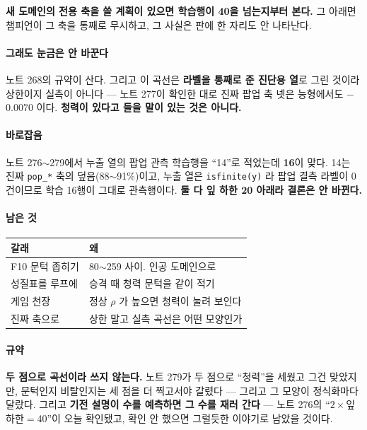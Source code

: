 \documentclass[10pt]{article}
\begin{document}
\textbf{새 도메인의 전용 축을 쓸 계획이 있으면 학습행이 40을 넘는지부터
본다.} 그 아래면 챔피언이 그 축을 통째로 무시하고, 그 사실은 판에 한 자리도
안 나타난다.

\paragraph{그래도 눈금은 안 바꾼다} 노트 268의 규약이 산다. 그리고 이
곡선은 \textbf{라벨을 통째로 준 진단용 열}로 그린 것이라 상한이지 실측이
아니다 --- 노트 277이 확인한 대로 진짜 팝업 축 넷은 능형에서도 $-$0.0070
이다. \textbf{청력이 있다고 들을 말이 있는 것은 아니다.}

\paragraph{바로잡음} 노트 276$\sim$279에서 누출 열의 팝업 관측 학습행을
``14''로 적었는데 \textbf{16}이 맞다. 14는 진짜 \texttt{pop\_*} 축의
덮음(88$\sim$91\%)이고, 누출 열은 \texttt{isfinite(y)} 라 팝업 결측 라벨이
0건이므로 학습 16행이 그대로 관측행이다. \textbf{둘 다 잎 하한 20 아래라
결론은 안 바뀐다.}

\paragraph{남은 것}
\begin{center}\small
\begin{tabular}{ll}
\hline
갈래 & 왜 \\
\hline
F10 문턱 좁히기 & 80$\sim$259 사이. 인공 도메인으로 \\
성질표를 루프에 & 승격 때 청력 문턱을 같이 적기 \\
게임 천장 & 정상 $\rho$ 가 높으면 청력이 눌려 보인다 \\
진짜 축으로 & 상한 말고 실측 곡선은 어떤 모양인가 \\
\hline
\end{tabular}
\end{center}

\paragraph{규약} \textbf{두 점으로 곡선이라 쓰지 않는다.} 노트 279가 두
점으로 ``청력''을 세웠고 그건 맞았지만, 문턱인지 비탈인지는 세 점을 더
찍고서야 갈렸다 --- 그리고 그 모양이 정식화마다 달랐다. 그리고 \textbf{기전
설명이 수를 예측하면 그 수를 재러 간다} --- 노트 276의
``$2{\times}$잎 하한$=$40''이 오늘 확인됐고, 확인 안 했으면 그럴듯한 이야기로
남았을 것이다.
\end{document}
